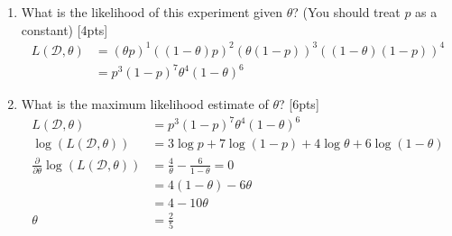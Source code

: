 \documentclass{article}
\begin{document}
\begin{enumerate}[label=(\alph*)]
\item What is the likelihood of this experiment given $\theta$? (You should treat $p$ as a constant) [4pts] \newline \begin{align*}
    L(\mathcal{D},\theta)&=(\theta p)^1((1-\theta)p)^2(\theta(1-p))^3((1-\theta)(1-p))^4 \\
    &=p^3(1-p)^7\theta^4(1-\theta)^6
\end{align*}
\item What is the maximum likelihood estimate of $\theta$? [6pts] \newline\begin{align*}
    L(\mathcal{D},\theta)&=p^3(1-p)^7\theta^4(1-\theta)^6 \\
    \log(L(\mathcal{D},\theta))&=3\log p+7\log(1-p)+4\log\theta+6\log(1-\theta) \\
    \frac{\partial}{\partial\theta}\log(L(\mathcal{D},\theta))&=\frac{4}{\theta}-\frac{6}{1-\theta} = 0 \\
    &=4(1-\theta)-6\theta \\
    &=4-10\theta \\
    \theta&=\frac{2}{5}
\end{align*}
\end{enumerate}
\end{document}
